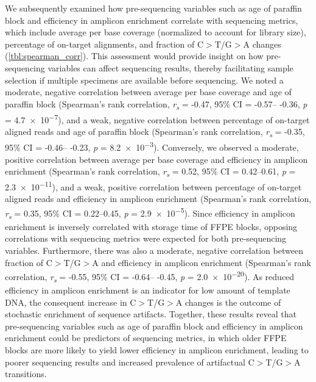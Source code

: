 We subsequently examined how pre-sequencing variables such as age of paraffin block and efficiency in amplicon enrichment correlate with sequencing metrics, which include average per base coverage (normalized to account for library size), percentage of on-target alignments, and fraction of C$>$T/G$>$A changes (\autoref{tbl:spearman_corr}). This assessment would provide insight on how pre-sequencing variables can affect sequencing results, thereby facilitating sample selection if multiple specimens are available before sequencing. We noted a moderate, negative correlation between average per base coverage and age of paraffin block (Spearman's rank correlation, \textit{r\textsubscript{s}} = -0.47, 95\% CI = -0.57-- -0.36, \textit{p} = \num{4.7e-7}), and a weak, negative correlation between percentage of on-target aligned reads and age of paraffin block (Spearman's rank correlation, \textit{r\textsubscript{s}} = -0.35, 95\% CI = -0.46-- -0.23, \textit{p} = \num{8.2e-3}). Conversely, we observed a moderate, positive correlation between average per base coverage and efficiency in amplicon enrichment (Spearman's rank correlation, \textit{r\textsubscript{s}} = 0.52, 95\% CI = 0.42--0.61, \textit{p} = \num{2.3e-11}), and a weak, positive correlation between percentage of on-target aligned reads and efficiency in amplicon enrichment (Spearman's rank correlation, \textit{r\textsubscript{s}} = 0.35, 95\% CI = 0.22--0.45, \textit{p} = \num{2.9e-5}). Since efficiency in amplicon enrichment is inversely correlated with storage time of FFPE blocks, opposing correlations with sequencing metrics were expected for both pre-sequencing variables. Furthermore, there was also a moderate, negative correlation between fraction of C$>$T/G$>$A and efficiency in amplicon enrichment (Spearman's rank correlation, \textit{r\textsubscript{s}} = -0.55, 95\% CI = -0.64-- -0.45, \textit{p} = \num{2.0e-20}). As reduced efficiency in amplicon enrichment is an indicator for low amount of template DNA, the consequent increase in C$>$T/G$>$A changes is the outcome of stochastic enrichment of sequence artifacts. Together, these results reveal that pre-sequencing variables such as age of paraffin block and efficiency in amplicon enrichment could be predictors of sequencing metrics, in which older FFPE blocks are more likely to yield lower efficiency in amplicon enrichment, leading to poorer sequencing results and increased prevalence of artifactual C$>$T/G$>$A transitions.


